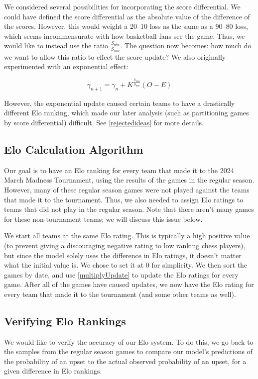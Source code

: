 \documentclass{article}
\begin{document}
We considered several possibilities for incorporating the score differential. We could have defined the score differential as the absolute value of the difference of the scores. However, this would weight a 20--10 loss as the same as a 90--80 loss, which seems incommensurate with how basketball fans see the game. Thus, we would like to instead use the ratio $\frac{S_{\text{win}}}{S_{\text{lose}}}$. The question now becomes: how much do we want to allow this ratio to effect the score update? We also originally experimented with an exponential effect:

\begin{equation}
    \label{exponentialUpdate}
    \gamma_{n+1} = \gamma_n + K^{\frac{S_{\text{win}}}{S_{\text{lose}}}}(O - E)
\end{equation}

However, the exponential update caused certain teams to have a drastically different Elo ranking, which made our later analysis (such as partitioning games by score differential) difficult. See \autoref{rejectedideas} for more details.

\subsection{Elo Calculation Algorithm}
Our goal is to have an Elo ranking for every team that made it to the 2024 March Madness Tournament, using the results of the games in the regular season. However, many of these regular season games were not played against the teams that made it to the tournament. Thus, we also needed to assign Elo ratings to teams that did not play in the regular season. Note that there aren't many games for these non-tournament teams; we will discuss this issue below. 

We start all teams at the same Elo rating. This is typically a high positive value (to prevent giving a discouraging negative rating to low ranking chess players), but since the model solely uses the difference in Elo ratings, it doesn't matter what the initial value is. We chose to set it at 0 for simplicity. We then sort the games by date, and use \autoref{multiplyUpdate} to update the Elo ratings for every game. After all of the games have caused updates, we now have the Elo rating for every team that made it to the tournament (and some other teams as well).


\subsection{Verifying Elo Rankings}\label{verify}
We would like to verify the accuracy of our Elo system. To do this, we go back to the samples from the regular season games to compare our model's predictions of the probability of an upset to the actual observed probability of an upset, for a given difference in Elo rankings. 
\end{document}
